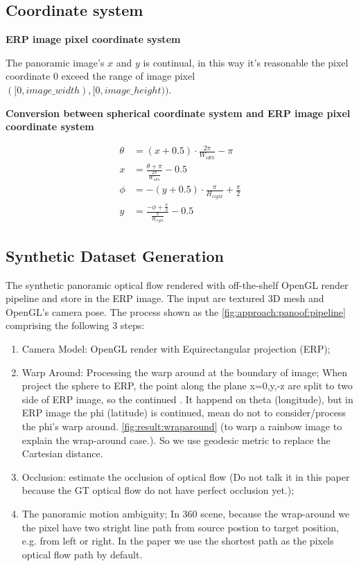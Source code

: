 \subsection{Coordinate system}

\textbf{ERP image pixel coordinate system}

The panoramic image's $x$ and $y$ is continual, in this way it's reasonable the pixel coordinate 0 exceed the range of image pixel $([0, image\_width), [0, image\_height))$. 


\textbf{Conversion between spherical coordinate system and ERP image pixel coordinate system}


\begin{equation}\label{equ:app:sph2erp}
	\begin{split}
		\theta &= (x+0.5) \cdot\frac{2 \pi}{W_{idth}}- \pi
		\\
		x &= \frac{\theta + \pi}{\frac{2\pi}{W_{idth}}} - 0.5
		\\
		\phi&=-(y+0.5) \cdot \frac{\pi}{H_{eight}} + \frac{\pi}{2}
		\\
		y &=\frac{-\phi+\frac{\pi}{2}}{\frac{\pi}{H_{eight}}}-0.5
	\end{split}
\end{equation}


\subsection{Synthetic Dataset Generation}

The synthetic panoramic optical flow rendered with off-the-shelf OpenGL render pipeline and store in the ERP image.
The input are textured 3D mesh and OpenGL's camera pose.
The process shown as the \cref{fig:approach:panoof:pipeline} comprising the following 3 steps:

\begin{enumerate}
	\item Camera Model: OpenGL render with Equirectangular projection (ERP);
	\item Warp Around: Processing the warp around at the boundary of image; When project the sphere to ERP, the point along the plane x=0,y,-z are split to two side of ERP image, so the continued . It happend on theta (longitude), but in ERP image the phi (latitude) is continued, mean do not to consider/process the phi's warp around. \cref{fig:result:wraparound} (to warp a rainbow image to explain the wrap-around case.). So we use geodesic metric to replace the Cartesian distance.
	\item Occlusion: estimate the occlusion of optical flow (Do not talk it in this paper because the GT optical flow do not have perfect occlusion yet.);
	\item The panoramic motion ambiguity; In 360 scene, because the wrap-around we the pixel have two stright line path from source postion to target position, e.g. from left or right. In the paper we use the shortest path as the pixels optical flow path by default.
\end{enumerate}

